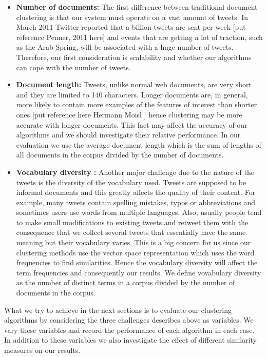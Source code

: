 \begin{itemize}
   \item \textbf{Number of documents:} The first difference between traditional document clustering is that our system must operate on a vast amount 
   of tweets. In March 2011 Twitter reported that a billion tweets are sent per week [put reference Penner, 2011 here] and events that are getting a lot 
   of traction, such as the Arab Spring, will be associated with a huge number of tweets. Therefore, our first consideration is scalability and whether our algorithms can cope with the 
   number of tweets.    
   \item \textbf{Document length:} Tweets, unlike normal web documents, are very short and they are limited to 140 characters. Longer documents are, in general, more likely
  to contain more examples of the features of interest than shorter ones [put reference here Hermann Moisl ] hence clustering may be more accurate with longer documents. This fact may 
  affect the accuracy of our algorithms and we should investigate their relative performance. In our evaluation we use the average document length which is the sum of lengths of all documents 
  in the corpus divided by the number of documents. 
   \item \textbf{Vocabulary diversity :} Another major challenge due to the nature of the tweets is the diversity of the vocabulary used. Tweets are supposed to be informal documents
   and this greatly affects the quality of their content. For example, many tweets contain spelling mistakes, typos or abbreviations and sometimes users use words from multiple languages.
   Also, usually people tend to make small modifications to existing tweets and retweet them with the consequence that we collect several tweets that essentially have the same meaning but their
   vocabulary varies. This is a big concern for us since our clustering methods use the vector space representation which uses the word frequencies to find similarities. Hence the vocabulary 
   diversity will affect the term frequencies and consequently our results. We define vovabulary diversity as the number of distinct terms in a corpus divided by the number of documents in the corpus.
\end{itemize} 
What we try to achieve in the next sections is to evaluate our clustering algorithms by considering the three challenges describes above as variables. We vary these variables and 
record the performance of each algorithm in each case. In addition to these variables we also investigate the effect of different similarity measures on our results. 

